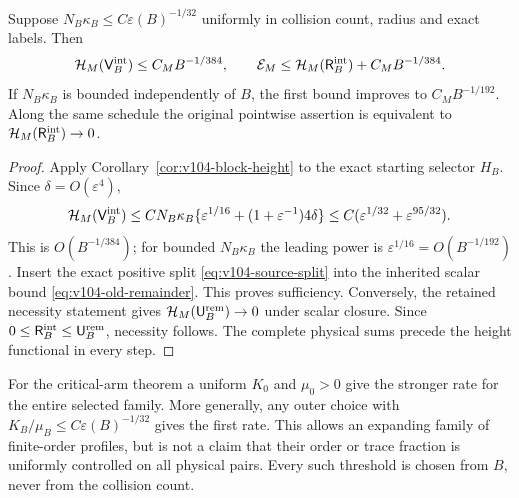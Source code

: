 \begin{theorem}
\label{thm:v104-recovery}
Suppose $N_B\kappa_B\le C\varepsilon(B)^{-1/32}$ uniformly in
collision count, radius and exact labels. Then
\begin{equation}\label{eq:v104-paid-recovery}
 \mathcal H_M(\mathsf V_B^{\rm int})\le C_MB^{-1/384},
 \qquad
 \mathcal E_M\le\mathcal H_M(\mathsf R_B^{\rm int})
                                      +C_MB^{-1/384}.
\end{equation}
If $N_B\kappa_B$ is bounded independently of $B$, the first bound
improves to $C_MB^{-1/192}$. Along the same schedule the original
pointwise assertion is equivalent to
$\mathcal H_M(\mathsf R_B^{\rm int})\to0$.
\end{theorem}
\begin{proof}
Apply Corollary~\ref{cor:v104-block-height} to the exact starting
selector $H_B$. Since $\delta=O(\varepsilon^4)$,
\[
 \mathcal H_M(\mathsf V_B^{\rm int})
 \le C N_B\kappa_B
       \{\varepsilon^{1/16}+(1+\varepsilon^{-1})4\delta\}
 \le C(\varepsilon^{1/32}+\varepsilon^{95/32}).
\]
This is $O(B^{-1/384})$; for bounded $N_B\kappa_B$ the leading
power is $\varepsilon^{1/16}=O(B^{-1/192})$. Insert the exact
positive split \eqref{eq:v104-source-split} into the inherited scalar
bound \eqref{eq:v104-old-remainder}. This proves sufficiency.
Conversely, the retained necessity statement gives
$\mathcal H_M(\mathsf U_B^{\rm rem})\to0$ under scalar closure.
Since $0\le\mathsf R_B^{\rm int}\le\mathsf U_B^{\rm rem}$,
necessity follows. The complete physical sums precede the height
functional in every step.
\end{proof}

For the critical-arm theorem a uniform $K_0$ and $\mu_0>0$ give
the stronger rate for the entire selected family. More generally,
any outer choice with $K_B/\mu_B\le C\varepsilon(B)^{-1/32}$
gives the first rate. This allows an expanding family of finite-order
profiles, but is not a claim that their order or trace fraction is
uniformly controlled on all physical pairs. Every such threshold is
chosen from $B$, never from the collision count.

